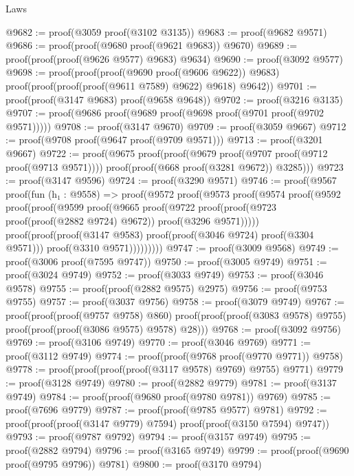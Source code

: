 \begin{lexlean}{Laws}
\begin{coremodule}
@9682 := proof(@3059 proof(@3102 @3135))
@9683 := proof(@9682 @9571)
@9686 := proof(proof(@9680 proof(@9621 @9683)) @9670)
@9689 := proof(proof(proof(@9626 @9577) @9683) @9634)
@9690 := proof(@3092 @9577)
@9698 := proof(proof(proof(@9690 proof(@9606 @9622)) @9683)
      proof(proof(proof(proof(@9611 @7589) @9622) @9618) @9642))
@9701 := proof(proof(@3147 @9683) proof(@9658 @9648))
@9702 := proof(@3216 @3135)
@9707 := proof(@9686 proof(@9689 proof(@9698 proof(@9701 proof(@9702 @9571)))))
@9708 := proof(@3147 @9670)
@9709 := proof(@3059 @9667)
@9712 := proof(@9708 proof(@9647 proof(@9709 @9571)))
@9713 := proof(@3201 @9667)
@9722 := proof(@9675
      proof(proof(@9679 proof(@9707 proof(@9712 proof(@9713 @9571))))
          proof(proof(@668 proof(@3281 @9672)) @3285)))
@9723 := proof(@3147 @9596)
@9724 := proof(@3290 @9571)
@9746 := proof(@9567
      proof(fun (h₁ : @9558) =>
        proof(@9572
            proof(@9573
                proof(@9574
                    proof(@9592
                        proof(proof(@9599
                              proof(@9665
                                  proof(@9722
                                      proof(proof(@9723 proof(proof(@2882 @9724) @9672))
                                          proof(@3296 @9571)))))
                            proof(proof(proof(@3147 @9583)
                                  proof(proof(@3046 @9724) proof(@3304 @9571)))
                                proof(@3310 @9571)))))))))
@9747 := proof(@3009 @9568)
@9749 := proof(@3006 proof(@7595 @9747))
@9750 := proof(@3005 @9749)
@9751 := proof(@3024 @9749)
@9752 := proof(@3033 @9749)
@9753 := proof(@3046 @9578)
@9755 := proof(proof(@2882 @9575) @2975)
@9756 := proof(@9753 @9755)
@9757 := proof(@3037 @9756)
@9758 := proof(@3079 @9749)
@9767 := proof(proof(proof(@9757 @9758) @860)
      proof(proof(proof(@3083 @9578) @9755) proof(proof(proof(@3086 @9575) @9578) @28)))
@9768 := proof(@3092 @9756)
@9769 := proof(@3106 @9749)
@9770 := proof(@3046 @9769)
@9771 := proof(@3112 @9749)
@9774 := proof(proof(@9768 proof(@9770 @9771)) @9758)
@9778 := proof(proof(proof(proof(@3117 @9578) @9769) @9755) @9771)
@9779 := proof(@3128 @9749)
@9780 := proof(@2882 @9779)
@9781 := proof(@3137 @9749)
@9784 := proof(proof(@9680 proof(@9780 @9781)) @9769)
@9785 := proof(@7696 @9779)
@9787 := proof(proof(@9785 @9577) @9781)
@9792 := proof(proof(proof(@3147 @9779) @7594) proof(proof(@3150 @7594) @9747))
@9793 := proof(@9787 @9792)
@9794 := proof(@3157 @9749)
@9795 := proof(@2882 @9794)
@9796 := proof(@3165 @9749)
@9799 := proof(proof(@9690 proof(@9795 @9796)) @9781)
@9800 := proof(@3170 @9794)

\end{coremodule}
\end{lexlean}
